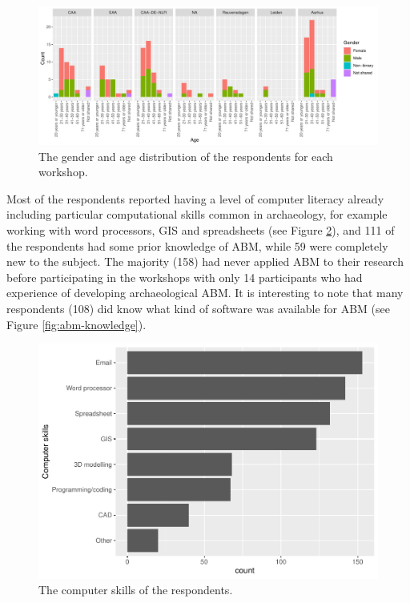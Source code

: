 \documentclass[
]{article}
\begin{document}
\begin{figure}
\centering
\includegraphics{paper_files/figure-latex/gender-age-1.pdf}
\caption{\label{fig:gender-age}The gender and age distribution of the respondents for each workshop.}
\end{figure}

Most of the respondents reported having a level of computer literacy already including particular computational skills common in archaeology, for example working with word processors, GIS and spreadsheets (see Figure \ref{fig:computer-skills}), and 111 of the respondents had some prior knowledge of ABM, while 59 were completely new to the subject. The majority (158) had never applied ABM to their research before participating in the workshops with only 14 participants who had experience of developing archaeological ABM. It is interesting to note that many respondents (108) did know what kind of software was available for ABM (see Figure \ref{fig:abm-knowledge}).

\begin{figure}
\includegraphics[width=0.5\linewidth]{paper_files/figure-latex/computer-skills-1} \caption{The computer skills of the respondents.}\label{fig:computer-skills}
\end{figure}
\end{document}
